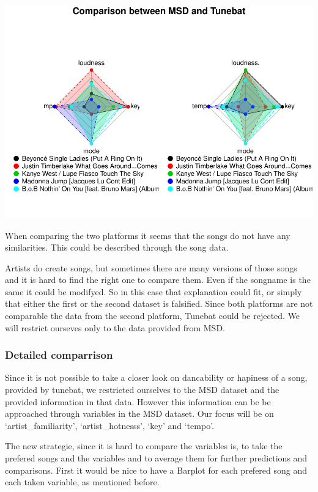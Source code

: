 \documentclass[]{article}
\begin{document}
\includegraphics{Project2_files/figure-latex/compareTunebat-1.pdf}

When comparing the two platforms it seems that the songs do not have any
similarities. This could be described through the song data.

Artists do create songs, but sometimes there are many versions of those
songs and it is hard to find the right one to compare them. Even if the
songname is the same it could be modifyed. So in this case that
explanation could fit, or simply that either the first or the second
dataset is falsified. Since both platforms are not comparable the data
from the second platform, Tunebat could be rejected. We will restrict
ourseves only to the data provided from MSD.

\subsubsection{Detailed comparrison}\label{detailed-comparrison}

Since it is not possible to take a closer look on dancability or
hapiness of a song, provided by tunebat, we restricted ourselves to the
MSD dataset and the provided information in that data. However this
information can be be approached through variables in the MSD dataset.
Our focus will be on `artist\_familiarity', `artist\_hotnesss', `key'
and `tempo'.

The new strategie, since it is hard to compare the variables is, to take
the prefered songs and the variables and to average them for further
predictions and comparisons. First it would be nice to have a Barplot
for each prefered song and each taken variable, as mentioned before.
\end{document}
